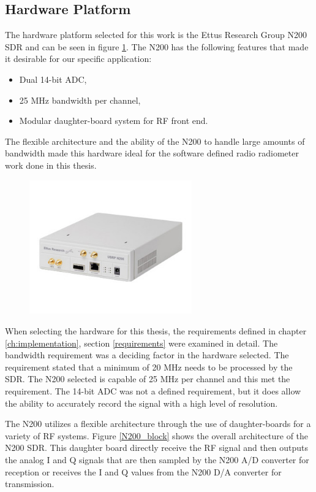 \subsection{Hardware Platform}
The hardware platform selected for this work is the Ettus Research Group N200 SDR and can be seen in figure \ref{N200}.  The N200 has the following features that made it desirable for our specific application:

\begin{itemize}
\item Dual 14-bit ADC,
\item 25 MHz bandwidth per channel,
\item Modular daughter-board system for RF front end.
\end{itemize}

The flexible architecture and the ability of the N200 to handle large amounts of bandwidth made this hardware ideal for the software defined radio radiometer work done in this thesis.

{\begin{figure}[h!tb] 
\centering
\includegraphics[width=7cm]{Images/n200}
\label{N200}
\end{figure}
}

When selecting the hardware for this thesis, the requirements defined in chapter \ref{ch:implementation}, section \ref{requirements} were examined in detail.  The bandwidth requirement was a deciding factor in the hardware selected.  The requirement stated that a minimum of 20 MHz needs to be processed by the SDR.  The N200 selected is capable of 25 MHz per channel and this met the requirement.  The 14-bit ADC was not a defined requirement, but it does allow the ability to accurately record the signal with a high level of resolution.  

The N200 utilizes a flexible architecture through the use of daughter-boards for a variety of RF systems.  Figure \ref{N200_block} shows the overall architecture of the N200 SDR.  This daughter board directly receive the RF signal and then outputs the analog I and Q signals that are then sampled by the N200 A/D converter for reception or receives the I and Q values from the N200 D/A converter for transmission. 

